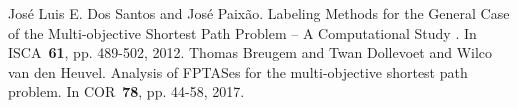 \documentclass[oneside, 10pt, twocolumn]{jarticle}
\begin{document}
\begin{thebibliography}{9} %
   José Luis E. Dos Santos and José Paixão.
   Labeling Methods for the General Case of the Multi-objective
   Shortest Path Problem – A Computational Study
   . In ISCA~\textbf{61}, pp. 489-502,
   2012.
    Thomas Breugem and Twan Dollevoet and Wilco van den Heuvel.
    Analysis of FPTASes for the multi-objective shortest path problem.
    In COR~\textbf{78}, pp. 44-58,
    2017.

\end{thebibliography}
\end{document}
